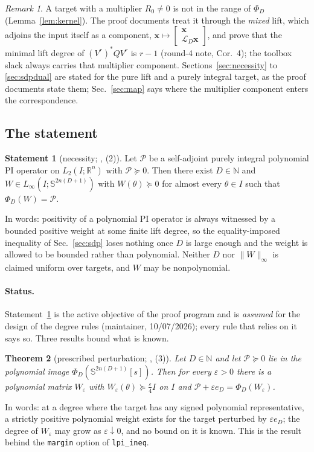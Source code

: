 \documentclass[12pt]{article}
\newcommand{\R}{\mathbb{R}}
\newcommand{\N}{\mathbb{N}}
\newcommand{\Sym}[1]{\mathbb{S}^{#1}}
\newcommand{\mcl}[1]{\mathcal{#1}}
\newcommand{\mbf}[1]{\mathbf{#1}}
\newcommand{\bmat}[1]{\begin{bmatrix} #1 \end{bmatrix}}
\newcommand{\code}[1]{\texttt{#1}}
\newcommand{\file}[1]{\path{#1}}
\theoremstyle{plain}
\newtheorem{theorem}{Theorem}[section]
\theoremstyle{definition}
\newtheorem{statement}[theorem]{Statement}
\theoremstyle{remark}
\newtheorem*{remark}{Remark}
\begin{document}
\begin{remark}
A target with a multiplier $R_0\ne0$ is not in the range of $\Phi_D$ (Lemma~\ref{lem:kernel}). The proof documents treat it through the \emph{mixed} lift, which adjoins the input itself as a component, $\mbf x\mapsto\bmat{\mbf x\\ \mcl L_{D}\mbf x}$, and prove that the minimal lift degree of $(V^r)^*QV^r$ is $r-1$ (round-4 note, Cor.~4); the toolbox slack always carries that multiplier component. Sections~\ref{sec:necessity} to \ref{sec:sdpdual} are stated for the pure lift and a purely integral target, as the proof documents state them; Sec.~\ref{sec:map} says where the multiplier component enters the correspondence.
\end{remark}

\subsection{The statement}

\begin{statement}[necessity; \file{proof_roadmap.md}, (2)]\label{st:necessity}
Let $\mcl P$ be a self-adjoint purely integral polynomial PI operator on $L_2(I;\R^n)$ with $\mcl P\succeq0$. Then there exist $D\in\N$ and $W\in L_\infty(I;\Sym{2n(D+1)})$ with $W(\theta)\succeq0$ for almost every $\theta\in I$ such that $\Phi_D(W)=\mcl P$.
\end{statement}
In words: positivity of a polynomial PI operator is always witnessed by a bounded positive weight at some finite lift degree, so the equality-imposed inequality of Sec.~\ref{sec:sdp} loses nothing once $D$ is large enough and the weight is allowed to be bounded rather than polynomial. Neither $D$ nor $\|W\|_\infty$ is claimed uniform over targets, and $W$ may be nonpolynomial.

\paragraph{Status.} Statement~\ref{st:necessity} is the active objective of the proof program and is \emph{assumed} for the design of the degree rules (maintainer, 10/07/2026); every rule that relies on it says so. Three results bound what is known.
\begin{theorem}[prescribed perturbation; \file{proof_roadmap.md}, (3)]\label{thm:perturb}
Let $D\in\N$ and let $\mcl P\succeq0$ lie in the polynomial image $\Phi_D(\Sym{2n(D+1)}[s])$. Then for every $\varepsilon>0$ there is a polynomial matrix $W_\varepsilon$ with $W_\varepsilon(\theta)\succeq\tfrac{\varepsilon}{4}I$ on $I$ and $\mcl P+\varepsilon e_D=\Phi_D(W_\varepsilon)$.
\end{theorem}
In words: at a degree where the target has any signed polynomial representative, a strictly positive polynomial weight exists for the target perturbed by $\varepsilon e_D$; the degree of $W_\varepsilon$ may grow as $\varepsilon\downarrow0$, and no bound on it is known. This is the result behind the \code{margin} option of \code{lpi\_ineq}.
\end{document}
